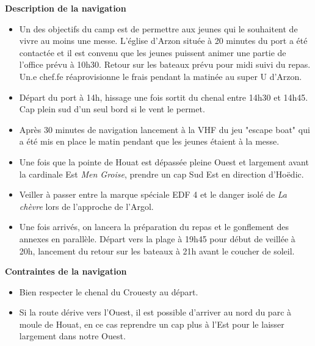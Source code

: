 \begin{minipage}[c][\textheight][t]{0.10\textwidth}
\hfill
\end{minipage}%
\begin{minipage}[c][\textheight][t]{0.50\textwidth}
    \vspace{2cm}
    \color{StrongBlue}    
    {\huge \textbf{Description de la navigation}}\\
            \begin{itemize}
                \item Un des objectifs du camp est de permettre aux jeunes qui le souhaitent de vivre au moins une messe. L'église d'Arzon située à 20 minutes du port a été contactée et il est convenu que les jeunes puissent animer une partie de l'office prévu à 10h30. Retour sur les bateaux prévu pour midi suivi du repas. Un.e chef.fe réaprovisionne le frais pendant la matinée au super U d'Arzon. 
                \item Départ du port à 14h, hissage une fois sortit du chenal entre 14h30 et 14h45. Cap plein sud d'un seul bord si le vent le permet.
                \item Après 30 minutes de navigation lancement à la VHF du jeu "escape boat" qui a été mis en place le matin pendant que les jeunes étaient à la messe.  
                \item Une fois que la pointe de Houat est dépassée pleine Ouest et largement avant la cardinale Est  \textit{Men Groise}, prendre un cap Sud Est en direction d'Hoëdic. 
                \item Veiller à passer entre la marque spéciale EDF 4 et le danger isolé de \textit{La chèvre} lors de l'approche de l'Argol. 
                \item Une fois arrivés, on lancera la préparation du repas et le gonflement des annexes en parallèle. Départ vers la plage à 19h45 pour début de veillée à 20h, lancement du retour sur les bateaux à 21h avant le coucher de soleil.   
            \end{itemize}
        {
        \huge \textbf{Contraintes de la navigation}}\\
            \begin{itemize}
                \item Bien respecter le chenal du Crouesty au départ. 
                \item Si la route dérive vers l'Ouest, il est possible d'arriver au nord du parc à moule de Houat, en ce cas reprendre un cap plus à l'Est pour le laisser largement dans notre Ouest. 

\end{itemize}
\end{minipage}

